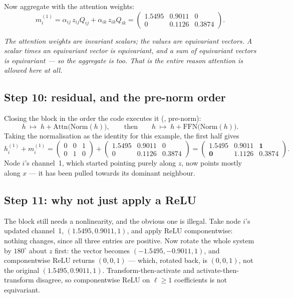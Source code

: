\documentclass[11pt,a4paper]{report}
\theoremstyle{definition}
\theoremstyle{remark}
\begin{document}
Now aggregate with the attention weights:
\[
m^{(1)}_i
=\alpha_{ij}\,z_{ij}Q_{ij}+\alpha_{ik}\,z_{ik}Q_{ik}
=\begin{pmatrix}1.5495 & 0.9011 & 0\\ 0 & 0.1126 & 0.3874\end{pmatrix} .
\]

\begin{center}
\emph{The attention weights are invariant scalars; the values are
equivariant vectors. A scalar times an equivariant vector is equivariant,
and a sum of equivariant vectors is equivariant --- so the aggregate is too.
That is the entire reason attention is allowed here at all.}
\end{center}

\subsection{Step 10: residual, and the pre-norm order}

Closing the block in the order the code executes it
(, pre-norm):
\[
h\;\mapsto\;h+\mathrm{Attn}\bigl(\mathrm{Norm}(h)\bigr),
\qquad\text{then}\qquad
h\;\mapsto\;h+\mathrm{FFN}\bigl(\mathrm{Norm}(h)\bigr).
\]
Taking the normalisation as the identity for this example, the first
half gives
\[
h^{(1)}_i+m^{(1)}_i
=\begin{pmatrix}0&0&1\\ 0&1&0\end{pmatrix}
+\begin{pmatrix}1.5495&0.9011&0\\ 0&0.1126&0.3874\end{pmatrix}
=\begin{pmatrix}\mathbf{1.5495}&\mathbf{0.9011}&\mathbf{1}\\
\mathbf{0}&\mathbf{1.1126}&\mathbf{0.3874}\end{pmatrix} .
\]
Node $i$'s channel~1, which started pointing purely along $z$, now points
mostly along $x$ --- it has been pulled towards its dominant neighbour.

\subsection{Step 11: why not just apply a ReLU}
\label{sec:toy-nonlinearity}

The block still needs a nonlinearity, and the obvious one is illegal. Take
node $i$'s updated channel~1, $(1.5495,0.9011,1)$, and apply $\mathrm{ReLU}$
componentwise: nothing changes, since all three entries are positive. Now
rotate the whole system by $180^\circ$ about $z$ first: the vector becomes
$(-1.5495,-0.9011,1)$, and componentwise $\mathrm{ReLU}$ returns
$(0,0,1)$ --- which, rotated back, is $(0,0,1)$, not the original
$(1.5495,0.9011,1)$. Transform-then-activate and activate-then-transform
disagree, so componentwise $\mathrm{ReLU}$ on $\ell\ge1$ coefficients is not
equivariant.
\end{document}
